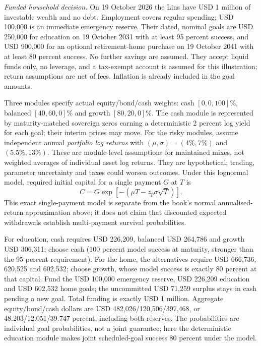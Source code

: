 \begin{qfmethod}
\emph{Funded household decision.} On 19 October 2026 the Lins have USD 1 million of investable wealth and no debt. Employment covers regular spending; USD 100{,}000 is an immediate emergency reserve. Their dated, nominal goals are USD 250{,}000 for education on 19 October 2031 with at least 95 percent success, and USD 900{,}000 for an optional retirement-home purchase on 19 October 2041 with at least 80 percent success. No further savings are assumed. They accept liquid funds only, no leverage, and a tax-exempt account is assumed for this illustration; return assumptions are net of fees. Inflation is already included in the goal amounts.

Three modules specify actual equity/bond/cash weights: cash $[0,0,100]\%$, balanced $[40,60,0]\%$ and growth $[80,20,0]\%$. The cash module is represented by maturity-matched sovereign zeros earning a deterministic 2 percent log yield for each goal; their interim prices may move. For the risky modules, assume independent annual \emph{portfolio log returns} with $(\mu,\sigma)=(4\%,7\%)$ and $(5.5\%,13\%)$. These are module-level assumptions for maintained mixes, not weighted averages of individual asset log returns. They are hypothetical; trading, parameter uncertainty and taxes could worsen outcomes. Under this lognormal model, required initial capital for a single payment $G$ at $T$ is
\[
C=G\exp[-(\mu T-z_p\sigma\sqrt T)].
\]
This exact single-payment model is separate from the book's normal annualised-return approximation above; it does not claim that discounted expected withdrawals establish multi-payment survival probabilities.

For education, cash requires USD 226{,}209, balanced USD 264{,}786 and growth USD 306{,}311; choose cash (100 percent model success at maturity, stronger than the 95 percent requirement). For the home, the alternatives require USD 666{,}736, 620{,}525 and 602{,}532; choose growth, whose model success is exactly 80 percent at that capital. Fund the USD 100{,}000 emergency reserve, USD 226{,}209 education and USD 602{,}532 home goals; the uncommitted USD 71{,}259 surplus stays in cash pending a new goal. Total funding is exactly USD 1 million. Aggregate equity/bond/cash dollars are USD 482{,}026/120{,}506/397{,}468, or 48.203/12.051/39.747 percent, including both reserves. The probabilities are individual goal probabilities, not a joint guarantee; here the deterministic education module makes joint scheduled-goal success 80 percent under the model.


\end{qfmethod}
